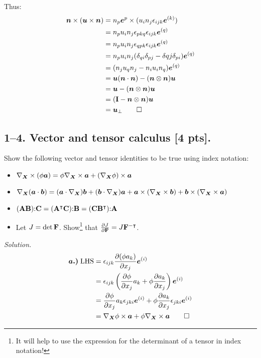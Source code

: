 Thus: 
\begin{align*}
\bm{n} \times (\bm{u} \times \bm{n}) &= n_p \bm{e}^{p} \times (u_i n_j \epsilon_{ijk} \bm{e}^{(k)}) \\
&= n_p u_i n_j \epsilon_{pkq} \epsilon_{ijk} \bm{e}^{(q)} \\
&= n_p u_i n_j \epsilon_{qpk} \epsilon_{ijk} \bm{e}^{(q)} \\
&= n_p u_i n_j (\delta_{qi} \delta_{pj} - \delta{qj} \delta_{pi}) \bm{e}^{(q)} \\
&= (n_j u_q n_j - n_i u_i n_q) \bm{e}^{(q)} \\
&= \bm{u} (\bm{n} \cdot \bm{n}) - (\bm{n} \otimes \bm{n}) \bm{u} \\
&= \bm{u} - (\bm{n} \otimes \bm{n}) \bm{u} \\
&= (\mathbf{I} - \bm{n} \otimes \bm{n}) \bm{u} \\
&= \bm{u}_{\perp} \qed \\
\end{align*}

\bigskip
\subsection*{1--4. \textbf{Vector and tensor calculus} [4 pts].} Show the following vector and tensor identities to be true using index notation:

\begin{itemize}
    \item $\nabla_{\bm{X}} \times (\phi \bm{a}) = \phi \nabla_{\bm{X}} \times \bm{a} + (\nabla_{\bm{X}}\phi) \times \bm{a}$
    \item $\nabla_{\bm{X}} (\bm{a} \cdot \bm{b}) = (\bm{a} \cdot \nabla_{\bm{X}}) \bm{b} + (\bm{b} \cdot \nabla_{\bm{X}}) \bm{a} + \bm{a} \times (\nabla_{\bm{X}} \times \bm{b}) + \bm{b} \times (\nabla_{\bm{X}} \times \bm{a})$
    \item $ (\mathbf{A} \mathbf{B}) \mathbf{:} \mathbf{C} = (\mathbf{A}^\intercal \mathbf{C})\mathbf{:} \mathbf{B} = (\mathbf{C} \mathbf{B}^\intercal)\mathbf{:} \mathbf{A}$
    \item Let $J = \det \mathbf{F}$. Show\footnote{It will help to use the expression for the determinant of a tensor in index notation!} that $\frac{\partial J}{\partial \mathbf{F}} = J \mathbf{F}^{-\intercal}$. 
\end{itemize}

\bigskip
\textit{Solution.}
\begin{align*}
\bm{a.)}\; \text{LHS} &= \epsilon_{ijk}\frac{\partial(\phi a_k)}{\partial x_j} \bm{e}^{(i)} \\
&= \epsilon_{ijk} \left(\frac{\partial \phi}{\partial x_j}a_k + \phi \frac{\partial a_k}{\partial x_j}\right) \bm{e}^{(i)} \\
&= \frac{\partial \phi}{\partial x_j} a_k \epsilon_{jki} \bm{e}^{(i)} + \phi \frac{\partial a_k}{\partial x_j} \epsilon_{jki} \bm{e}^{(i)} \\
&= \nabla_{\bm{X}}\phi \times \bm{a} + \phi \nabla_{\bm{X}} \times \bm{a} \qed \\
\end{align*}

